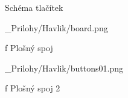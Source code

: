 \app Schéma tlačítek

\medskip {}
\picw=12cm _Prilohy/Havlik/board.png
\caption/f Plošný spoj
\medskip

\medskip
\medskip
\medskip

\medskip {}
\picw=12cm _Prilohy/Havlik/buttons01.png
\caption/f Plošný spoj 2
\medskip

\par